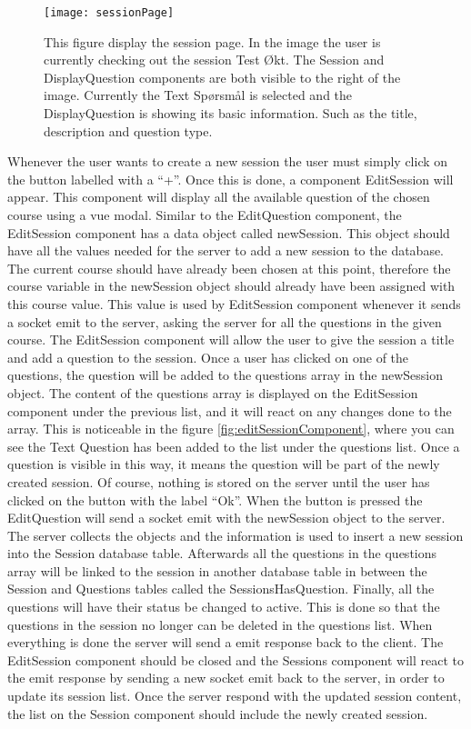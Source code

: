 \begin{figure}[H]
	\texttt{[image: sessionPage]}
	\caption{This figure display the session page. In the image the user is currently checking out the session Test Økt. The Session and DisplayQuestion components are both visible to the right of the image. Currently the Text Spørsmål is selected and the DisplayQuestion is showing its basic information. Such as the title, description and question type.}
	\label{fig:sessionPage}
\end{figure}
\noindent
Whenever the user wants to create a new session the user must simply click on the button labelled with a “+”. Once this is done, a component EditSession will appear. This component will display all the available question of the chosen course using a vue modal. Similar to the EditQuestion component, the EditSession component has a data object called newSession. This object should have all the values needed for the server to add a new session to the database. The current course should have already been chosen at this point, therefore the course variable in the newSession object should already have been assigned with this course value. This value is used by EditSession component whenever it sends a socket emit to the server, asking the server for all the questions in the given course. The EditSession component will allow the user to give the session a title and add a question to the session. Once a user has clicked on one of the questions, the question will be added to the questions array in the newSession object. The content of the questions array is displayed on the EditSession component under the previous list, and it will react on any changes done to the array. This is noticeable in the figure \ref{fig:editSessionComponent}, where you can see the Text Question has been added to the list under the questions list. Once a question is visible in this way, it means the question will be part of the newly created session. Of course, nothing is stored on the server until the user has clicked on the button with the label “Ok”. When the button is pressed the EditQuestion will send a socket emit with the newSession object to the server. The server collects the objects and the information is used to insert a new session into the Session database table. Afterwards all the questions in the questions array will be linked to the session in another database table in between the Session and Questions tables called the SessionsHasQuestion. Finally, all the questions will have their status be changed to active. This is done so that the questions in the session no longer can be deleted in the questions list. When everything is done the server will send a emit response back to the client. The EditSession component should be closed and the Sessions component will react to the emit response by sending a new socket emit back to the server, in order to update its session list. Once the server respond with the updated session content, the list on the Session component should include the newly created session.  
